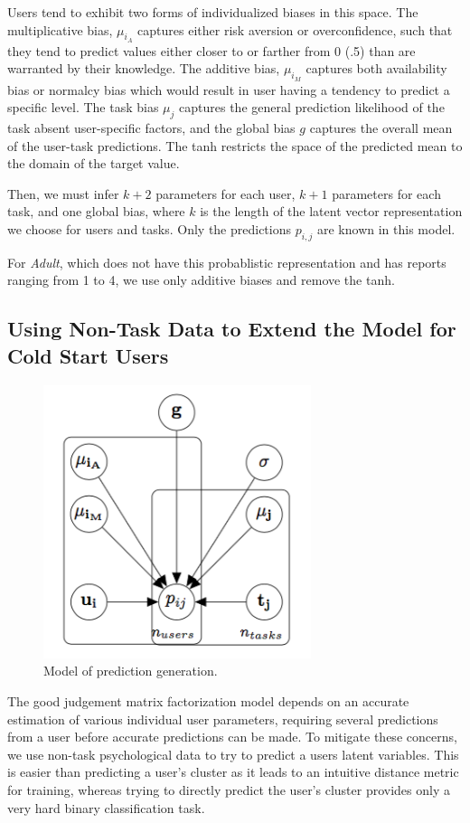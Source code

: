 \documentclass{article}
\begin{document}
Users tend to exhibit two forms of individualized biases in this space. The multiplicative bias, $\mu_{i_A}$ captures either risk aversion or overconfidence, such that they tend to predict values either closer to or farther from 0 (.5) than are warranted by their knowledge. The additive bias, $ \mu_{i_M}$ captures both availability bias or normalcy bias which would result in user having a tendency to predict a specific level. The task bias $\mu_j$ captures the general prediction likelihood of the task absent user-specific factors, and the global bias $g$ captures the overall mean of the user-task predictions.
  The tanh restricts the space of the predicted mean to the domain of the target value.
  
  Then, we must infer $k+2$ parameters for each user, $k+1$ parameters for each task, and one global bias, where $k$ is the length of the latent vector representation we choose for users and tasks. Only the predictions $p_{i,j}$ are known in this model.
  
      For \emph{Adult}, which does not have this probablistic representation and has reports ranging from 1 to 4, we use only additive biases and remove the tanh.
      
\subsection{Using Non-Task Data to Extend the Model for Cold Start Users}\label{ssec:non-task}

\begin{figure}[t]
  \centering
  \includegraphics[height=8cm]{dgmaccurate.png}
  \caption{\label{fig:diagram} Model of prediction generation.}
\end{figure}
 
           
The good judgement matrix factorization model depends on an accurate estimation of various individual user parameters, requiring several predictions from a user before accurate predictions can be made. To mitigate these concerns, we use non-task psychological data to try to predict a users latent variables. This is easier than predicting a user's cluster as it leads to an intuitive distance metric for training, whereas trying to directly predict the user's cluster provides only a very hard binary classification task.
\end{document}
